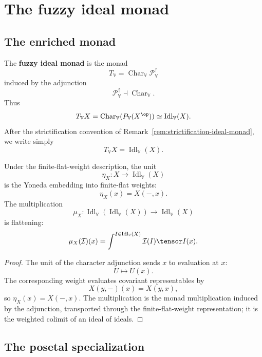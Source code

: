 \section{The fuzzy ideal monad}
\label{sec:fuzzy-ideal-monad}

\subsection{The enriched monad}
\label{subsec:fuzzy-ideal-monad-enriched}

\begin{definition}
\label{def:fuzzy-ideal-monad-enriched}
The \textbf{fuzzy ideal monad} is the monad
\[
    T_{\mathbb V}
    =
    \operatorname{Char}_{\mathbb V}\mathcal P_{\mathbb V}^{\uparrow}
\]
induced by the adjunction
\[
    \mathcal P_{\mathbb V}^{\uparrow}
    \dashv
    \operatorname{Char}_{\mathbb V}.
\]
Thus
\[
    T_{\mathbb V}X
    =
    \operatorname{Char}_{\mathbb V}(P_{\mathbb V}(X^{\op}))
    \simeq
    \operatorname{Idl}_{\mathbb V}(X).
\]
After the strictification convention of
Remark~\ref{rem:strictification-ideal-monad}, we write simply
\[
    T_{\mathbb V}X=\operatorname{Idl}_{\mathbb V}(X).
\]
\end{definition}

\begin{proposition}
\label{prop:fuzzy-ideal-monad-unit-multiplication-enriched}
Under the finite-flat-weight description, the unit
\[
    \eta_X:X\to\operatorname{Idl}_{\mathbb V}(X)
\]
is the Yoneda embedding into finite-flat weights:
\[
    \eta_X(x)=X(-,x).
\]
The multiplication
\[
    \mu_X:
    \operatorname{Idl}_{\mathbb V}(\operatorname{Idl}_{\mathbb V}(X))
    \to
    \operatorname{Idl}_{\mathbb V}(X)
\]
is flattening:
\[
    \mu_X(\mathcal I)(x)
    =
    \int^{I\in\operatorname{Idl}_{\mathbb V}(X)}
    \mathcal I(I)\tensor I(x).
\]
\end{proposition}

\begin{proof}
The unit of the character adjunction sends \(x\) to evaluation at \(x\):
\[
    U\longmapsto U(x).
\]
The corresponding weight evaluates covariant representables by
\[
    X(y,-)(x)=X(y,x),
\]
so \(\eta_X(x)=X(-,x)\).  The multiplication is the monad multiplication induced by
the adjunction, transported through the finite-flat-weight representation; it is
the weighted colimit of an ideal of ideals.
\end{proof}

\subsection{The posetal specialization}
\label{subsec:fuzzy-ideal-monad-posetal}

